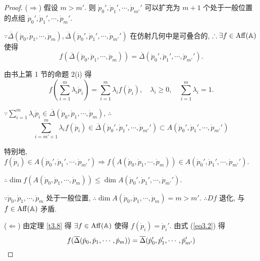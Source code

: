 \documentclass[color=black,device=normal,lang=cn,mode=geye]{elegantnote}
\begin{document}
\begin{proof}
    ($\Rightarrow$) 假设 $m>m'$. 则 $\dot{p}_0',\dot{p}_1',\cdots,\dot{p}_{m'}'$ 可以扩充为 $m+1$ 个处于一般位置的点组 $\dot{p}_0',\dot{p}_1',\cdots,\dot{p}_m'$.
    
    $\because\overline{\Delta}(\dot{p}_0,\dot{p}_1,\cdots,\dot{p}_m),\overline{\Delta}(\dot{p}_0',\dot{p}_1',\cdots,\dot{p}_{m'}')$ 在仿射几何中是可叠合的, $\therefore\exists f\in\operatorname{Aff} (\mathbb{A})$ 使得
    \begin{equation}\label{eq3.2}
        f(\overline{\Delta}(\dot{p}_0,\dot{p}_1,\cdots,\dot{p}_m))=\overline{\Delta}(\dot{p}_0',\dot{p}_1',\cdots,\dot{p}_{m'}').
    \end{equation}


    由书上第 1 节的命题 2(i) 得
    \[f\left(\sum\limits_{i=1}^m\lambda_i\dot{p}_i\right)=\sum\limits_{i=1}^m\lambda_if(\dot{p}_i),\quad\lambda_i\geq0,\quad\sum\limits_{i=1}^m\lambda_i=1.\]

    $\because\sum\limits_{i=1}^m\lambda_i\dot{p}_i\in\overline{\Delta}(\dot{p}_0,\dot{p}_1,\cdots,\dot{p}_m)$, $\therefore$
    \[\sum\limits_{i=m'+1}^m\lambda_if(\dot{p}_i)\in\overline{\Delta}(\dot{p}_0',\dot{p}_1',\cdots,\dot{p}_{m'}')\subset A(\dot{p}_0',\dot{p}_1',\cdots,\dot{p}_{m'}')\]

    特别地, $f(\dot{p}_i)\in A(\dot{p}_0',\dot{p}_1',\cdots,\dot{p}_{m'}')\Rightarrow f(A(\dot{p}_0,\dot{p}_1,\cdots,\dot{p}_m))\in A(\dot{p}_0',\dot{p}_1',\cdots,\dot{p}_{m'}')$.
    
    $\therefore\dim f(A(\dot{p}_0,\dot{p}_1,\cdots,\dot{p}_m))\leq\dim A(\dot{p}_0',\dot{p}_1',\cdots,\dot{p}_{m'}')$.

    $\because\dot{p}_0,\dot{p}_1,\cdots,\dot{p}_m$ 处于一般位置, $\therefore\dim A(\dot{p}_0,\dot{p}_1,\cdots,\dot{p}_m)=m>m'$. $\therefore Df$ 退化, 与 $f\in\operatorname{Aff} (\mathbb{A})$ 矛盾.

    ($\Leftarrow$) 由定理 \ref{t3.8} 得 $\exists f\in\operatorname{Aff} (\mathbb{A})$ 使得 $f(\dot{p}_i)=\dot{p}_i'$. 由式 (\ref{eq3.2}) 得
    \[f(\overline{\Delta}(\dot{p}_0,\dot{p}_1,\cdots,\dot{p}_m))=\overline{\Delta}(\dot{p}_0',\dot{p}_1',\cdots,\dot{p}_{m'}')\qedhere\]
\end{proof}
\end{document}

